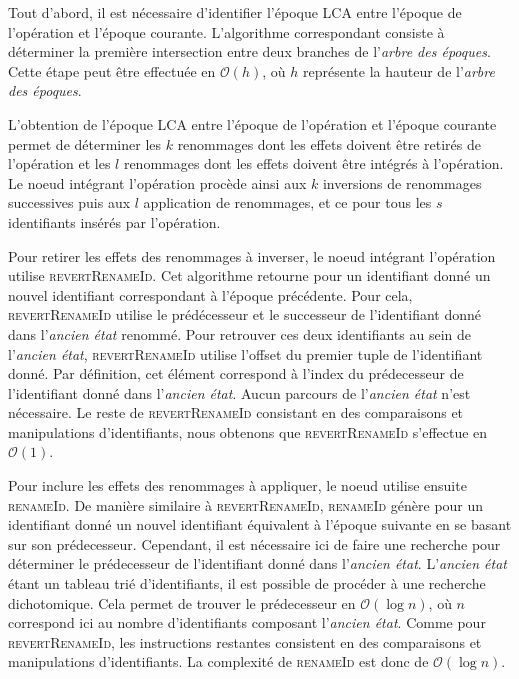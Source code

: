 \documentclass[12pt]{thesul}
\newcommand\bigO[1]{$\mathcal{O}(#1)$}
\begin{document}
Tout d'abord, il est nécessaire d'identifier l'époque \ac{LCA} entre l'époque de l'opération et l'époque courante.
L'algorithme correspondant consiste à déterminer la première intersection entre deux branches de l'\emph{arbre des époques}.
Cette étape peut être effectuée en \bigO{h}, où $h$ représente la hauteur de l'\emph{arbre des époques}.

L'obtention de l'époque \ac{LCA} entre l'époque de l'opération et l'époque courante permet de déterminer les $k$ renommages dont les effets doivent être retirés de l'opération et les $l$ renommages dont les effets doivent être intégrés à l'opération.
Le noeud intégrant l'opération procède ainsi aux $k$ inversions de renommages successives puis aux $l$ application de renommages, et ce pour tous les $s$ identifiants insérés par l'opération.

Pour retirer les effets des renommages à inverser, le noeud intégrant l'opération utilise \textsc{revertRenameId}.
Cet algorithme retourne pour un identifiant donné un nouvel identifiant correspondant à l'époque précédente.
Pour cela, \textsc{revertRenameId} utilise le prédécesseur et le successeur de l'identifiant donné dans l'\emph{ancien état} renommé.
Pour retrouver ces deux identifiants au sein de l'\emph{ancien état}, \textsc{revertRenameId} utilise l'offset du premier tuple de l'identifiant donné.
Par définition, cet élément correspond à l'index du prédecesseur de l'identifiant donné dans l'\emph{ancien état}.
Aucun parcours de l'\emph{ancien état} n'est nécessaire.
Le reste de \textsc{revertRenameId} consistant en des comparaisons et manipulations d'identifiants, nous obtenons que \textsc{revertRenameId} s'effectue en \bigO{1}.

Pour inclure les effets des renommages à appliquer, le noeud utilise ensuite \textsc{renameId}.
De manière similaire à \textsc{revertRenameId}, \textsc{renameId} génère pour un identifiant donné un nouvel identifiant équivalent à l'époque suivante en se basant sur son prédecesseur.
Cependant, il est nécessaire ici de faire une recherche pour déterminer le prédecesseur de l'identifiant donné dans l'\emph{ancien état}.
L'\emph{ancien état} étant un tableau trié d'identifiants, il est possible de procéder à une recherche dichotomique.
Cela permet de trouver le prédecesseur en \bigO{\log{}n}, où $n$ correspond ici au nombre d'identifiants composant l'\emph{ancien état}.
Comme pour \textsc{revertRenameId}, les instructions restantes consistent en des comparaisons et manipulations d'identifiants.
La complexité de \textsc{renameId} est donc de \bigO{\log{}n}.
\end{document}
